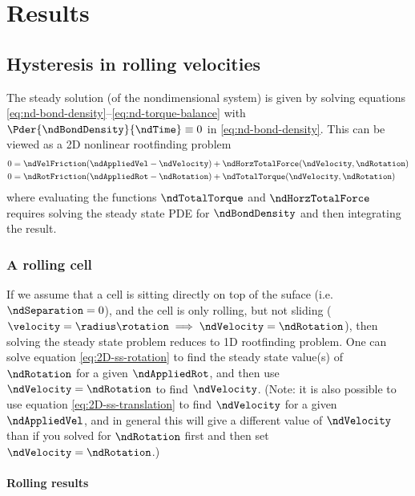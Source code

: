 
\chapter{Results}
\label{cha:results}

\section{Hysteresis in rolling velocities}
\label{sec:hyst-roll-veloc}

The steady solution (of the nondimensional system) is given by solving
equations \eqref{eq:nd-bond-density}--\eqref{eq:nd-torque-balance}
with $\Pder{\ndBondDensity}{\ndTime} \equiv 0$ in
\eqref{eq:nd-bond-density}. This can be viewed as a 2D nonlinear
rootfinding problem
\begin{align}
  \label{eq:2D-ss-translation}
  0 &= \ndVelFriction (\ndAppliedVel - \ndVelocity) +
      \ndHorzTotalForce(\ndVelocity, \ndRotation) \\
  \label{eq:2D-ss-rotation}
  0 &= \ndRotFriction (\ndAppliedRot - \ndRotation) +
      \ndTotalTorque(\ndVelocity, \ndRotation)
\end{align}
where evaluating the functions $\ndTotalTorque$ and
$\ndHorzTotalForce$ requires solving the steady state PDE for
$\ndBondDensity$ and then integrating the result.

\subsection{A rolling cell}
\label{sec:rolling-cell}

If we assume that a cell is sitting directly on top of the suface
(i.e. $\ndSeparation = 0$), and the cell is only rolling, but not
sliding
($\velocity = \radius\rotation \implies \ndVelocity = \ndRotation$),
then solving the steady state problem reduces to 1D rootfinding
problem. One can solve equation \eqref{eq:2D-ss-rotation} to find the
steady state value(s) of $\ndRotation$ for a given $\ndAppliedRot$,
and then use $\ndVelocity = \ndRotation$ to find $\ndVelocity$. (Note:
it is also possible to use equation \eqref{eq:2D-ss-translation} to
find $\ndVelocity$ for a given $\ndAppliedVel$, and in general this
will give a different value of $\ndVelocity$ than if you solved for
$\ndRotation$ first and then set $\ndVelocity = \ndRotation$.)

\subsubsection{Rolling results}
\label{sec:rolling-results}

